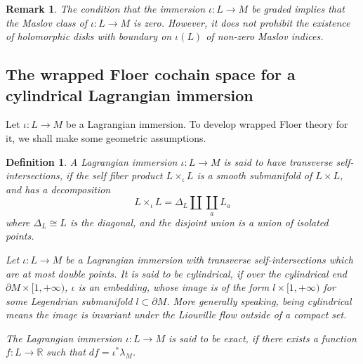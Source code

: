 \documentclass{amsart}
\newtheorem{definition}[theorem]{Definition}
\newtheorem{remark}[theorem]{Remark}
\numberwithin{equation}{section}
\numberwithin{figure}{section}
\begin{document}
\begin{remark}
	The condition that the immersion $\iota: L \to M$ be graded implies that the Maslov class of $\iota: L \to M$ is zero. However, it does not prohibit the existence of holomorphic disks with boundary on $\iota(L)$ of non-zero Maslov indices.
\end{remark}

\subsection{The wrapped Floer cochain space for a cylindrical Lagrangian immersion}\label{section: wrapped Floer cochain space for a cylindrical Lagrangian immersion}
	Let $\iota: L \to M$ be a Lagrangian immersion. To develop wrapped Floer theory for it, we shall make some geometric assumptions. \par

\begin{definition}
	A Lagrangian immersion $\iota: L \to M$ is said to have transverse self-intersections, if the self fiber product $L \times_{\iota} L$ is a smooth submanifold of $L \times L$, and has a decomposition
\begin{equation}
L \times_{\iota} L  = \Delta_{L} \coprod \coprod_{a} L_{a}
\end{equation}
where $\Delta_{L} \cong L$ is the diagonal, and the disjoint union is a union of isolated points. \par	
	Let $\iota: L \to M$ be a Lagrangian immersion with transverse self-intersections which are at most double points. It is said to be cylindrical, if over the cylindrical end $\partial M \times [1, +\infty)$, $\iota$ is an embedding, whose image is of the form $l \times [1, +\infty)$ for some Legendrian submanifold $l \subset \partial M$. More generally speaking, being cylindrical means the image is invariant under the Liouville flow outside of a compact set. \par
	The Lagrangian immersion $\iota: L \to M$ is said to be exact, if there exists a function $f: L \to \mathbb{R}$ such that $df = \iota^{*} \lambda_{M}$. \par
\end{definition}
\end{document}
